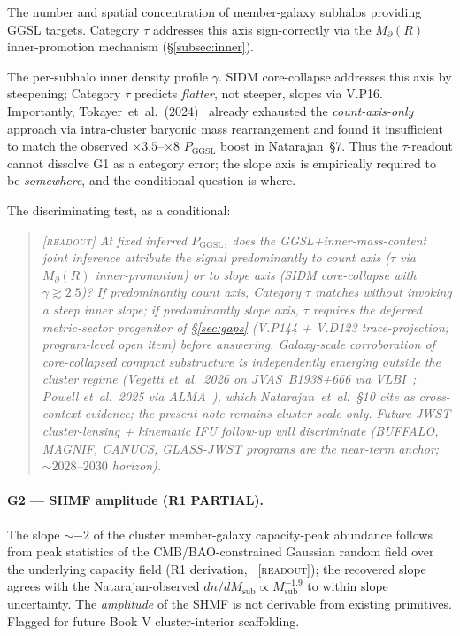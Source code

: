 \documentclass{pantarhei-researchnote}
\newcommand{\Mpa}{M_{\partial}}                 %
\newcommand{\Msub}{M_{\mathrm{sub}}}
\newcommand{\Pggsl}{P_{\mathrm{GGSL}}}
\newcommand{\readout}{\textsc{[readout]}}
\begin{document}
\begin{description}[leftmargin=1.7em,itemsep=0.3em]
\item[Count axis.] The number and spatial concentration of
member-galaxy subhalos providing GGSL targets. Category $\tau$
addresses this axis sign-correctly via the $\Mpa(R)$ inner-promotion
mechanism (\S\ref{subsec:inner}).
\item[Slope axis.] The per-subhalo inner density profile $\gamma$. SIDM
core-collapse addresses this axis by steepening; Category $\tau$
predicts \emph{flatter}, not steeper, slopes via V.P16. Importantly,
Tokayer~et~al.~(2024)~\cite{Tokayer2024} already exhausted the
\emph{count-axis-only} approach via intra-cluster baryonic mass
rearrangement and found it insufficient to match the observed
$\times 3.5$--$\times 8$ $\Pggsl$ boost in Natarajan~\S{}7. Thus the
$\tau$-readout cannot dissolve G1 as a category error; the slope axis
is empirically required to be \emph{somewhere}, and the conditional
question is where.
\end{description}

\noindent
The discriminating test, as a conditional:
\begin{quote}\itshape\readout
At fixed inferred $\Pggsl$, does the GGSL+inner-mass-content joint
inference attribute the signal predominantly to count axis ($\tau$ via
$\Mpa(R)$ inner-promotion) or to slope axis (SIDM core-collapse with
$\gamma \gtrsim 2.5$)? If predominantly count axis,
Category $\tau$ matches without invoking a steep inner slope; if
predominantly slope axis, $\tau$ requires the deferred metric-sector
progenitor of \S\ref{sec:gaps} (V.P144 + V.D123 trace-projection;
program-level open item) before answering. Galaxy-scale corroboration of
core-collapsed compact substructure is independently emerging outside
the cluster regime (Vegetti et~al.\ 2026 on JVAS~B1938+666 via
VLBI~\cite{Vegetti2026}; Powell et~al.\ 2025 via ALMA~\cite{Powell2025}),
which Natarajan~et~al.\ \S{}10 cite as cross-context evidence; the
present note remains cluster-scale-only. Future JWST cluster-lensing
+ kinematic IFU follow-up will discriminate (BUFFALO, MAGNIF, CANUCS,
GLASS-JWST programs are the near-term anchor; $\sim 2028$--$2030$ horizon).
\end{quote}

\paragraph{G2 — SHMF amplitude (R1 PARTIAL).}
The slope $\sim -2$ of the cluster member-galaxy capacity-peak abundance
follows from peak statistics of the CMB/BAO-constrained Gaussian random
field over the underlying capacity field (R1 derivation, ~\readout); the
recovered slope agrees with the Natarajan-observed $dn/d\Msub \propto
\Msub^{-1.9}$ to within slope uncertainty. The \emph{amplitude} of the
SHMF is not derivable from existing primitives. Flagged for future
Book V cluster-interior scaffolding.
\end{document}
